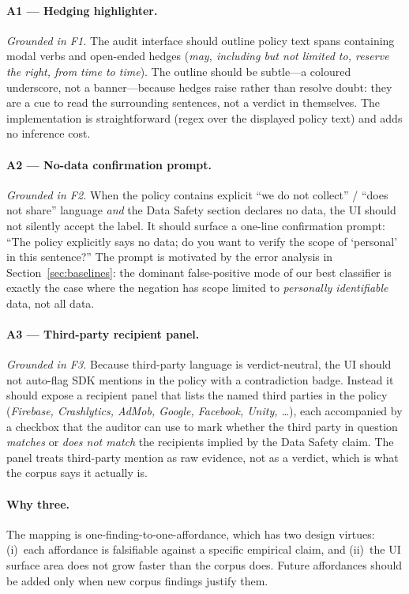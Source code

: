 \documentclass[11pt,a4paper]{article}
\begin{document}
\paragraph{A1 --- Hedging highlighter.}
\emph{Grounded in F1.} The audit interface should outline policy text
spans containing modal verbs and open-ended hedges
(\emph{may, including but not limited to, reserve the right, from
time to time}). The outline should be subtle---a coloured underscore,
not a banner---because hedges raise rather than resolve doubt: they
are a cue to read the surrounding sentences, not a verdict in
themselves. The implementation is straightforward (regex over the
displayed policy text) and adds no inference cost.

\paragraph{A2 --- No-data confirmation prompt.}
\emph{Grounded in F2.} When the policy contains explicit
``we do not collect'' / ``does not share'' language \emph{and} the
Data Safety section declares no data, the UI should not silently
accept the label. It should surface a one-line confirmation prompt:
``The policy explicitly says no data; do you want to verify the scope
of `personal' in this sentence?'' The prompt is motivated by the
error analysis in Section~\ref{sec:baselines}: the dominant
false-positive mode of our best classifier is exactly the case where
the negation has scope limited to \emph{personally identifiable}
data, not all data.

\paragraph{A3 --- Third-party recipient panel.}
\emph{Grounded in F3.} Because third-party language is
verdict-neutral, the UI should not auto-flag SDK mentions in the
policy with a contradiction badge. Instead it should expose a
recipient panel that lists the named third parties in the policy
(\emph{Firebase, Crashlytics, AdMob, Google, Facebook, Unity, \dots}),
each accompanied by a checkbox that the auditor can use to mark
whether the third party in question \emph{matches} or \emph{does not
match} the recipients implied by the Data Safety claim. The panel
treats third-party mention as raw evidence, not as a verdict, which is
what the corpus says it actually is.

\paragraph{Why three.}
The mapping is one-finding-to-one-affordance, which has two design
virtues: (i)~each affordance is falsifiable against a specific
empirical claim, and (ii)~the UI surface area does not grow faster
than the corpus does. Future affordances should be added only when
new corpus findings justify them.
\end{document}

